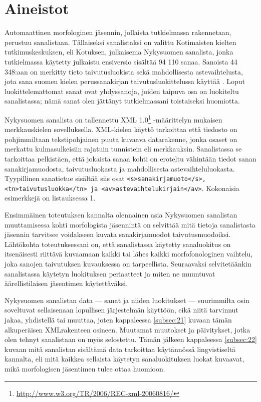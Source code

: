 \documentclass[free]{flammie}
\begin{document}
\section{Aineistot} \label{sec:aineistot}

Automaattinen morfologinen jäsennin, jollaista tutkielmassa rakennetaan,
perustuu sanalistaan. Tällaiseksi sanalistaksi on valittu Kotimaisten kielten
tutkimuskeskuksen, eli Kotuksen, julkaisema Nykysuomen sanalista, jonka
tutkielmassa käytetty julkaistu ensiversio sisältää 94 110 sanaa. Sanoista 44
348:aan on merkitty tieto taivutusluokista sekä mahdollisesta astevaihtelusta,
jota sana suomen kielen perussanakirjan taivutusluokittelussa käyttää
\cite{nykysuomensanalista2006}. Loput luokittelemattomat sanat ovat
yhdyssanoja, joiden taipuva osa on luokiteltu sanalistassa; nämä sanat olen
jättänyt tutkielmassani toistaiseksi huomiotta.

Nykysuomen sanalista on
tallennettu XML 1.0\footnote{\url{http://www.w3.org/TR/2006/REC-xml-20060816/}}
-määrittelyn mukaisen merkkauskielen sovelluksella.
XML-kielen käyttö tarkoittaa että tiedosto on pohjimmiltaan tekstipohjainen
puuta kuvaava datarakenne, jonka osaset on merkattu kulmasulkeisiin rajatuin
tunnistein eli merkkauksin. Sanalistassa se tarkoittaa pelkistäen, että jokaista
sanaa kohti on eroteltu vähintään tiedot sanan sanakirjamuodosta,
taivutusluokasta ja mahdollisesta astevaihteluluokasta. Tyypillinen sanatietue
sisältää siis osat \texttt{<s>sanakirjamuoto</s>, <tn>taivutusluokka</tn> ja
<av>astevaihtelukirjain</av>}. Kokonaisia esimerkkejä on listauksessa 1.

Ensimmäinen toteutuksen kannalta olennainen asia Nykysuomen sanalistan
muuttamisessa kohti morfologista jäsennintä on selvittää mitä tietoja
sanalistasta jäsennin tarvitsee voidakseen kuvata sanakirjamuodot
taivutusmuodoiksi. Lähtökohta toteutuksessani on, että sanalistassa käytetty
sanaluokitus on itsenäisesti riittävä kuvaamaan kaikki tai lähes kaikki
morfofonologinen vaihtelu, joka sanojen taivutuksen kuvauksessa on tarpeellista.
Seuraavaksi selvitetäänkin sanalistassa käytetyn luokituksen periaatteet ja
miten ne muuntuvat äärellistilaisen jäsentimen käytettäväksi.

Nykysuomen
sanalistan data — sanat ja niiden luokitukset — suurimmilta osin soveltuvat
sellaisenaan lopullisen järjestelmän käyttöön, eikä niitä tarvinnut jakaa,
yhdistellä tai muuttaa, joten kappaleessa \ref{subsec:21} kuvaan tämän alkuperäisen
XMLrakenteen osineen. Muutamat muutokset ja päivitykset, jotka olen tehnyt
sanalistaan on myös selostettu. Tämän jälkeen kappaleessa \ref{subsec:22} kuvaan mitä
sanalistan sisältämä data tarkoittaa käytännössä lingvistiseltä kannalta, eli
mitä kaikkea sellaista käytetyn sanaluokituksen luokat kuvaavat, mikä
morfologisen jäsentimen tulee ottaa huomioon.
\end{document}
